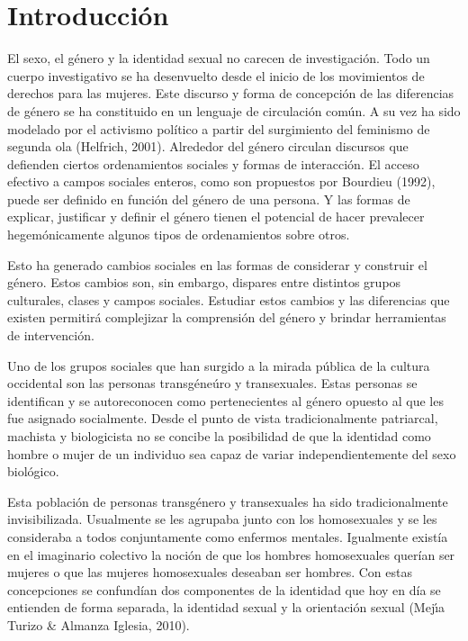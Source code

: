 \chapter{Introducción}\label{ch:intro}

El sexo, el género y la identidad sexual no carecen de investigación.
Todo un cuerpo investigativo se ha desenvuelto desde el inicio de los
movimientos de derechos para las mujeres.
Este discurso y forma de concepción de las diferencias de género se ha
constituido en un lenguaje de circulación común.
A su vez ha sido modelado por el activismo político a partir del surgimiento
del feminismo de segunda ola (Helfrich, 2001).
Alrededor del género circulan discursos que defienden ciertos ordenamientos
sociales y formas de interacción.
El acceso efectivo a campos sociales enteros, como son propuestos por
Bourdieu (1992), puede ser definido en función del género de una persona.
Y las formas de explicar, justificar y definir el género tienen el potencial
de hacer prevalecer hegemónicamente algunos tipos de ordenamientos sobre otros.

Esto ha generado cambios sociales en las formas de considerar y construir el
género.
Estos cambios son, sin embargo, dispares entre distintos grupos culturales,
clases y campos sociales.
Estudiar estos cambios y las diferencias que existen permitirá complejizar
la comprensión del género y brindar herramientas de intervención.

Uno de los grupos sociales que han surgido a la mirada pública de la cultura
occidental son las personas transgéneúro y transexuales.
Estas personas se identifican y se autoreconocen como pertenecientes al
género opuesto al que les fue asignado socialmente.
Desde el punto de vista tradicionalmente patriarcal, machista y biologicista
no se concibe la posibilidad de que la identidad como hombre o mujer de un
individuo sea capaz de variar independientemente del sexo biológico.

Esta población de personas transgénero y transexuales ha sido
tradicionalmente invisibilizada.
Usualmente se les agrupaba junto con los homosexuales y se les consideraba a
todos conjuntamente como enfermos mentales.
Igualmente existía en el imaginario colectivo la noción de que los hombres
homosexuales querían ser mujeres o que las mujeres homosexuales deseaban ser
hombres.
Con estas concepciones se confundían dos componentes de la identidad que hoy
en día se entienden de forma separada, la identidad sexual y la orientación
sexual (Mejı́a Turizo \& Almanza Iglesia, 2010).

